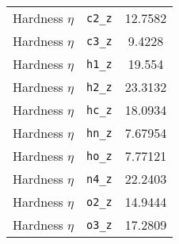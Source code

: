\begin{table}[ht]
\begin{tabular}{lcc}
Hardness $\eta$ & \verb^c2_z^ & 12.7582 \\ 
Hardness $\eta$ & \verb^c3_z^ & 9.4228 \\ 
Hardness $\eta$ & \verb^h1_z^ & 19.554 \\ 
Hardness $\eta$ & \verb^h2_z^ & 23.3132 \\ 
Hardness $\eta$ & \verb^hc_z^ & 18.0934 \\ 
Hardness $\eta$ & \verb^hn_z^ & 7.67954 \\ 
Hardness $\eta$ & \verb^ho_z^ & 7.77121 \\ 
Hardness $\eta$ & \verb^n4_z^ & 22.2403 \\ 
Hardness $\eta$ & \verb^o2_z^ & 14.9444 \\ 
Hardness $\eta$ & \verb^o3_z^ & 17.2809 \\ 
\hline
\end{tabular}
\end{table}
